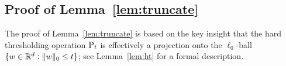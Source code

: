 
\subsection{Proof of Lemma~\ref{lem:truncate}}

The proof of Lemma~\ref{lem:truncate} is based on the key insight that the hard thresholding operation $\operatorname{P}_t$
 is effectively a projection onto the $\ell_0$-ball $\{w \in \mathbb{R}^d: \| w \|_0 \leq t\}$; see Lemma~\ref{lem:ht}
 for a formal description.

